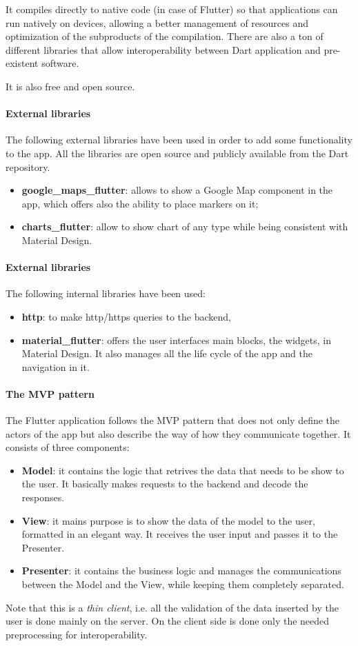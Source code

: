 It compiles directly to native code (in case of Flutter) so that applications can run natively on devices, allowing a better management of resources and optimization of the subproducts of the compilation.
There are also a ton of different libraries that allow interoperability between Dart application and pre-existent software.

It is also free and open source.

\paragraph{External libraries} The following external libraries have been used in order to add some functionality to the app. All the libraries are open source and publicly available from the Dart repository.
\begin{itemize}
    \item \textbf{google\_maps\_flutter}: allows to show a Google Map component in the app, which offers also the ability to place markers on it;
    \item \textbf{charts\_flutter}: allow to show chart of any type while being consistent with Material Design.
\end{itemize}


\paragraph{External libraries} The following internal libraries have been used:
\begin{itemize}
    \item \textbf{http}: to make http/https queries to the backend,
    \item \textbf{material\_flutter}: offers the user interfaces main blocks, the widgets, in Material Design. It also manages all the life cycle of the app and the navigation in it.
\end{itemize}

\paragraph{The MVP pattern} The Flutter application follows the MVP pattern that does not only define the actors of the app but also describe the way of how they communicate together. It consists of three components:
\begin{itemize}
    \item \textbf{Model}: it contains the logic that retrives the data that needs to be show to the user. It basically makes requests to the backend and decode the responses.
    \item \textbf{View}: it mains purpose is to show the data of the model to the user, formatted in an elegant way. It receives the user input and passes it to the Presenter.
    \item \textbf{Presenter}: it contains the business logic and manages the communications between the Model and the View, while keeping them completely separated.
\end{itemize}

Note that this is a \textit{thin client}, i.e. all the validation of the data inserted by the user is done mainly on the server. On the client side is done only the needed preprocessing for interoperability. 


